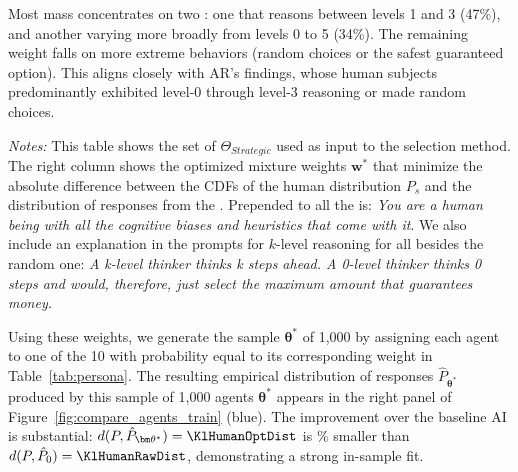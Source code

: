 Most mass concentrates on two : one that reasons between levels 1 and 3 (47\%), and another varying more broadly from levels 0 to 5 (34\%). 
The remaining weight falls on more extreme behaviors (random choices or the safest guaranteed option). 
This aligns closely with AR's findings, whose human subjects predominantly exhibited level-0 through level-3 reasoning or made random choices.

\begin{table}[h!]
\begin{center}
\caption{Proposed \aisub{}  and resulting mixture weights from the selection method} 
\label{tab:persona}
\footnotesize
\setlength{\tabcolsep}{7pt}

\end{center}
\begin{footnotesize}
\begin{singlespace}
\vspace*{-0.05in}
\emph{Notes:}
This table shows the set of  $\Theta_{Strategic}$ used as input to the selection method.
The right column shows the optimized mixture weights $\mathbf{w}^*$ that minimize the absolute difference between the CDFs of the human distribution $P_s$ and the distribution of responses from the .
Prepended to all the  is: \emph{You are a human being with all the cognitive biases and heuristics that come with it}. 
We also include an explanation in the prompts for $k$-level reasoning for all  besides the random one: \emph{A k-level thinker thinks k steps ahead. A 0-level thinker thinks 0 steps and would, therefore, just select the maximum amount that guarantees money.}
\end{singlespace}
\end{footnotesize}
\end{table}
  
Using these weights, we generate the sample $\bm{\theta}^*$ of 1,000  by assigning each agent to one of the 10  with probability equal to its corresponding weight in Table~\ref{tab:persona}. 
The resulting empirical distribution of responses $\hat P_{\bm\theta^*}$ produced by this sample of 1,000 agents $\bm{\theta}^*$ appears in the right panel of Figure~\ref{fig:compare_agents_train} (blue).
The improvement over the baseline AI is substantial: $d(P, \hat P_{\bm\theta^*}) = \KlHumanOptDist$ is \KlPercDiffBasic\% smaller than $d(P, \hat P_0) = \KlHumanRawDist$, demonstrating a strong in-sample fit.
  